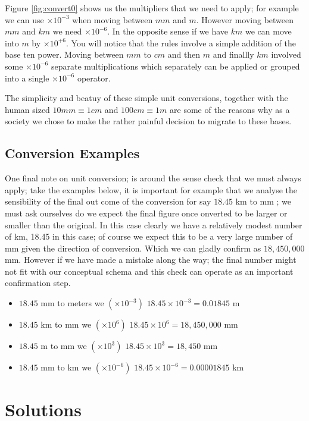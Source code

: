 Figure \ref{fig:convert0} shows us the multipliers that we need to apply; for example we can use $ \times 10^{-3}$ when moving between $mm$ and $m$. However moving between $mm$ and $km$ we need $ \times 10^{-6}$. In the opposite sense if we have $km$ we can move into $m$ by $ \times 10^{+6}$. You will notice that the rules involve a simple addition of the base ten power. Moving between $mm$ to $cm$ and then $m$ and finallly $km$ involved some $ \times 10^{-6}$ separate multiplications which separately can be applied or grouped into a single $ \times 10^{-6}$ operator. 

The simplicity and beatuy of these simple unit conversions, together with the human sized $ 10mm \equiv 1 cm $ and $ 100cm \equiv 1m $ are some of the reasons why as a society we chose to make the rather painful decision to migrate to these bases.

\subsection{Conversion Examples}

One final note on unit conversion; is around the sense check that we must always apply; take the examples below, it is important for example that we analyse the sensibility of the final out come of the conversion for say  $18.45$ km to mm ; we must ask ourselves do we expect the final figure once onverted to be larger or smaller than the original. In this case clearly we have a relatively modest number of km, 18.45 in this case; of course we expect this to be a very large number of mm given the direction of conversion. Which we can gladly confirm as  $  18,450,000$ mm. However if we have made a mistake along the way; the final number might not fit with our conceptual schema and this check can operate as an important confirmation step.

\begin{itemize}
  \item \eg $18.45$ mm to meters we $(\times 10^{-3}) $ $18.45 \times 10^{-3} = 0.01845$ m
  \item \eg $18.45$ km to mm we $(\times 10^{6}) $ $18.45 \times 10^{6} = 18,450,000$ mm
  \item \eg $18.45$ m to mm we $(\times 10^{3}) $ $18.45 \times 10^{3} = 18,450 $ mm
  \item \eg $18.45$ mm to km we $(\times 10^{-6}) $ $18.45 \times 10^{-6} = 0.00001845$ km
\end{itemize}

\section{Solutions}

